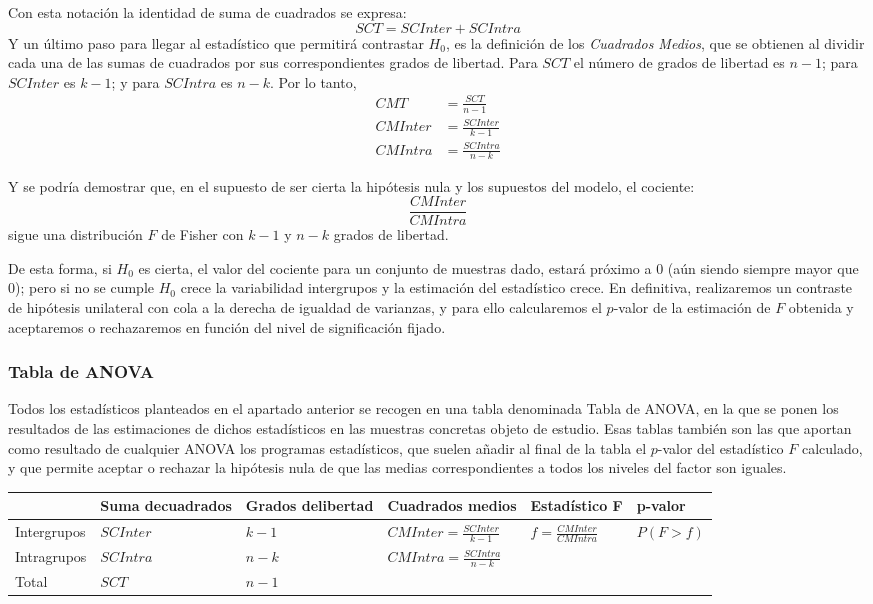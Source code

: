 Con esta notación la identidad de suma de cuadrados se expresa:
\[
SCT=SCInter+SCIntra
\]
Y un último paso para llegar al estadístico que permitirá contrastar $H_0$, es la definición de los \emph{Cuadrados Medios}, que se obtienen al dividir cada una de las sumas de cuadrados por
sus correspondientes grados de libertad. Para $SCT$ el número de grados de libertad es $n-1$; para $SCInter$ es $k-1$; y para $SCIntra$ es $n-k$. Por lo tanto,
\begin{align*}
CMT &= \frac{SCT}{n - 1}\\
CMInter &= \frac{SCInter}{k - 1}\\
CMIntra &= \frac{SCIntra}{n -k}
\end{align*}

Y se podría demostrar que, en el supuesto de ser cierta la hipótesis nula y los supuestos del modelo, el cociente:
\[
\frac{{CMInter}}{{CMIntra}}
\]
sigue una distribución $F$ de Fisher con $k-1$ y $n-k$ grados de libertad.

De esta forma, si $H_0$ es cierta, el valor del cociente para un conjunto de muestras dado, estará próximo a 0 (aún siendo siempre mayor que 0); pero si no se cumple $H_0$ crece la variabilidad intergrupos y la estimación del estadístico crece. En definitiva, realizaremos un contraste de hipótesis unilateral con cola a la derecha de igualdad de varianzas, y para ello calcularemos el $p$-valor de la estimación de $F$ obtenida y aceptaremos o rechazaremos en función del nivel de significación fijado.

\subsubsection{Tabla de ANOVA}
Todos los estadísticos planteados en el apartado anterior se recogen en una tabla denominada Tabla de ANOVA, en la que se ponen los resultados de las estimaciones de dichos estadísticos en las muestras concretas objeto de estudio. 
Esas tablas también son las que aportan como resultado de cualquier ANOVA los programas
estadísticos, que suelen añadir al final de la tabla el $p$-valor del estadístico $F$ calculado, y que permite aceptar o rechazar la hipótesis nula de que las medias correspondientes a todos los niveles del factor son iguales.
\begin{center}
\renewcommand{\arraystretch}{1.5}
\begin{tabular}{lp{2cm}p{2cm}p{3.3cm}p{2.5cm}p{1.7cm}}
\hline
 & Suma de\newline cuadrados & Grados de\newline libertad & Cuadrados medios & Estadístico F & p-valor\\
\hline
Intergrupos & $SCInter$ & $k-1$ & $CMInter=\frac{SCInter}{k-1}$ & $f=\frac{CMInter}{CMIntra}$ & $P(F>f)$ \\
Intragrupos & $SCIntra$ & $n-k$ & $CMIntra=\frac{SCIntra}{n-k}$ &  & \\
Total & $SCT$ & $n-1$ & & & \\
\hline
\end{tabular}
\end{center}


